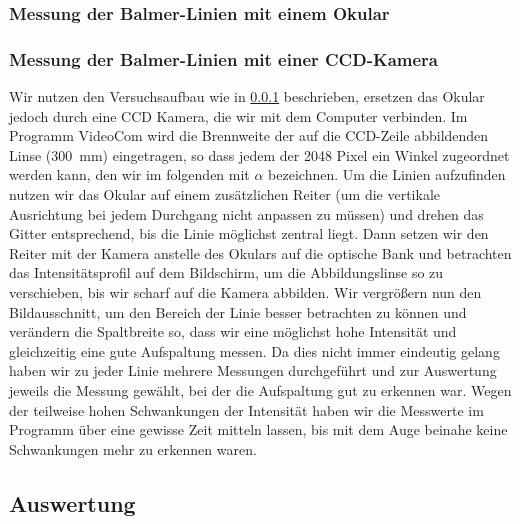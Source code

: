 \documentclass[11pt, a4paper]{article}
\numberwithin{equation}{section}
\begin{document}
\subsubsection{Messung der Balmer-Linien mit einem Okular}
\label{sssec:balmer_okular}

\subsubsection{Messung der Balmer-Linien mit einer CCD-Kamera}
Wir nutzen den Versuchsaufbau wie in \ref{sssec:balmer_okular} beschrieben, ersetzen das Okular jedoch durch eine CCD Kamera, die wir mit dem Computer verbinden.
Im Programm VideoCom wird die Brennweite der auf die CCD-Zeile abbildenden Linse (\SI{300}{\milli\meter}) eingetragen, so dass jedem der 2048 Pixel ein Winkel zugeordnet werden kann, den wir im folgenden mit $\alpha$ bezeichnen.
Um die Linien aufzufinden nutzen wir das Okular auf einem zusätzlichen Reiter (um die vertikale Ausrichtung bei jedem Durchgang nicht anpassen zu müssen) und drehen das Gitter entsprechend, bis die Linie möglichst zentral liegt.
Dann setzen wir den Reiter mit der Kamera anstelle des Okulars auf die optische Bank und betrachten das Intensitätsprofil auf dem Bildschirm, um die Abbildungslinse so zu verschieben, bis wir scharf auf die Kamera abbilden.
Wir vergrößern nun den Bildausschnitt, um den Bereich der Linie besser betrachten zu können und verändern die Spaltbreite so, dass wir eine möglichst hohe Intensität und gleichzeitig eine gute Aufspaltung messen.
Da dies nicht immer eindeutig gelang haben wir zu jeder Linie mehrere Messungen durchgeführt und zur Auswertung jeweils die Messung gewählt, bei der die Aufspaltung gut zu erkennen war.
Wegen der teilweise hohen Schwankungen der Intensität haben wir die Messwerte im Programm über eine gewisse Zeit mitteln lassen, bis mit dem Auge beinahe keine Schwankungen mehr zu erkennen waren.

\subsection{Auswertung}
\end{document}
